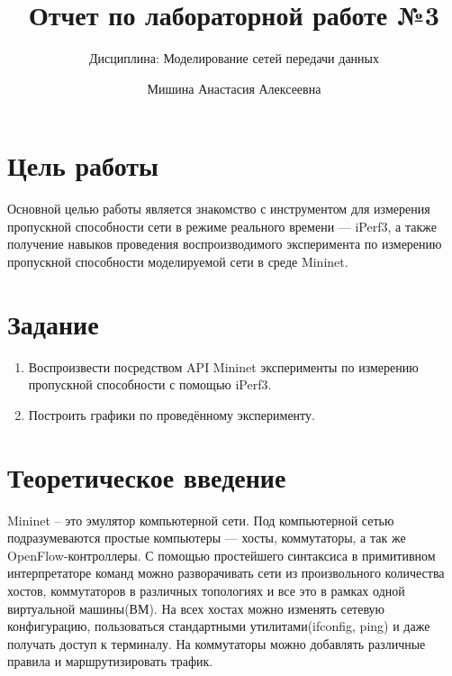 \documentclass[
  english,
  russian,
  12pt,
  a4paper,
  DIV=11,
  numbers=noendperiod]{scrreprt}
\title{Отчет по лабораторной работе №3}
\subtitle{Дисциплина: Моделирование сетей передачи данных}
\author{Мишина Анастасия Алексеевна}
\date{}
\providecommand{\tightlist}{%
  \setlength{\itemsep}{0pt}\setlength{\parskip}{0pt}}
\renewcommand*\contentsname{Содержание}
\newcommand\contentsname{Содержание}
\begin{document}
\maketitle

\renewcommand*\contentsname{Содержание}
{
\setcounter{tocdepth}{1}
\tableofcontents
}
\listoffigures
\listoftables

\chapter{Цель
работы}\label{ux446ux435ux43bux44c-ux440ux430ux431ux43eux442ux44b}

Основной целью работы является знакомство с инструментом для измерения
пропускной способности сети в режиме реального времени --- iPerf3, а
также получение навыков проведения воспроизводимого эксперимента по
измерению пропускной способности моделируемой сети в среде Mininet.

\chapter{Задание}\label{ux437ux430ux434ux430ux43dux438ux435}

\begin{enumerate}
\def\labelenumi{\arabic{enumi}.}
\tightlist
\item
  Воспроизвести посредством API Mininet эксперименты по измерению
  пропускной способности с помощью iPerf3.
\item
  Построить графики по проведённому эксперименту.
\end{enumerate}

\chapter{Теоретическое
введение}\label{ux442ux435ux43eux440ux435ux442ux438ux447ux435ux441ux43aux43eux435-ux432ux432ux435ux434ux435ux43dux438ux435}

Mininet\autocite{mininet} -- это эмулятор компьютерной сети. Под
компьютерной сетью подразумеваются простые компьютеры --- хосты,
коммутаторы, а так же OpenFlow-контроллеры. С помощью простейшего
синтаксиса в примитивном интерпретаторе команд можно разворачивать сети
из произвольного количества хостов, коммутаторов в различных топологиях
и все это в рамках одной виртуальной машины(ВМ). На всех хостах можно
изменять сетевую конфигурацию, пользоваться стандартными
утилитами(ifconfig, ping) и даже получать доступ к терминалу. На
коммутаторы можно добавлять различные правила и маршрутизировать трафик.
\end{document}

